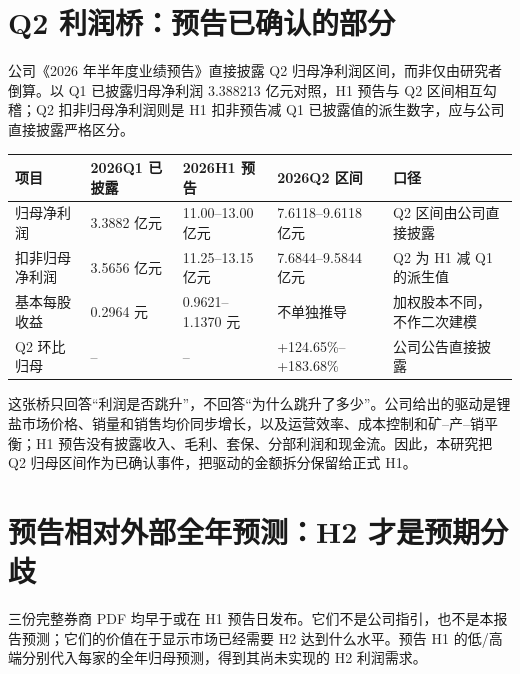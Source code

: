 \section{Q2 利润桥：预告已确认的部分}

公司《2026 年半年度业绩预告》直接披露 Q2 归母净利润区间，而非仅由研究者倒算。以 Q1 已披露归母净利润 3.388213 亿元对照，H1 预告与 Q2 区间相互勾稽；Q2 扣非归母净利润则是 H1 扣非预告减 Q1 已披露值的派生数字，应与公司直接披露严格区分。

\begin{exhibitbox}
\begin{tabularx}{\exhibitboxwidth}{L{3.1cm}R{2.4cm}R{2.7cm}R{2.7cm}X}
\toprule
项目 & 2026Q1 已披露 & 2026H1 预告 & 2026Q2 区间 & 口径 \\
\midrule
归母净利润 & 3.3882 亿元 & 11.00--13.00 亿元 & 7.6118--9.6118 亿元 & Q2 区间由公司直接披露 \\
扣非归母净利润 & 3.5656 亿元 & 11.25--13.15 亿元 & 7.6844--9.5844 亿元 & Q2 为 H1 减 Q1 的派生值 \\
基本每股收益 & 0.2964 元 & 0.9621--1.1370 元 & 不单独推导 & 加权股本不同，不作二次建模 \\
Q2 环比归母 & -- & -- & +124.65\%--+183.68\% & 公司公告直接披露 \\
\bottomrule
\end{tabularx}
\end{exhibitbox}

这张桥只回答“利润是否跳升”，不回答“为什么跳升了多少”。公司给出的驱动是锂盐市场价格、销量和销售均价同步增长，以及运营效率、成本控制和矿--产--销平衡；H1 预告没有披露收入、毛利、套保、分部利润和现金流。因此，本研究把 Q2 归母区间作为已确认事件，把驱动的金额拆分保留给正式 H1。

\section{预告相对外部全年预测：H2 才是预期分歧}

三份完整券商 PDF 均早于或在 H1 预告日发布。它们不是公司指引，也不是本报告预测；它们的价值在于显示市场已经需要 H2 达到什么水平。预告 H1 的低/高端分别代入每家的全年归母预测，得到其尚未实现的 H2 利润需求。


